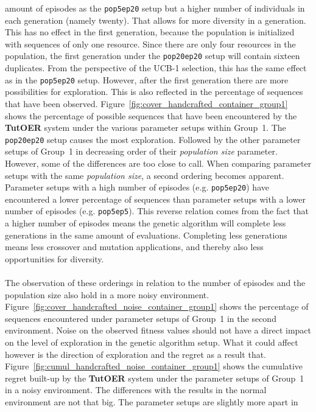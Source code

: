 amount of episodes as the \texttt{pop5ep20} setup but a higher number of
individuals in each generation (namely twenty). That allows for more diversity in a
generation. This has no effect in the first generation, because the
population is initialized with sequences of only one resource. Since there are
only four resources in the population, the first generation under the
\texttt{pop20ep20} setup will contain sixteen duplicates. From the perspective of
the UCB-1 selection, this has the same effect as in the \texttt{pop5ep20} setup.
However, after the first generation there are more possibilities for
exploration. This is also reflected in the percentage of sequences that have
been observed. Figure~\ref{fig:cover_handcrafted_container_group1}
shows the percentage of possible sequences that have been encountered by the
\textbf{TutOER} system under the various parameter setups within Group~1. The
\texttt{pop20ep20} setup causes the most exploration. Followed by the other
parameter setups of Group~1 in decreasing order of their \emph{population size}
parameter. However, some of the differences are too close to call. When comparing
parameter setups with the same \emph{population size}, a second
ordering becomes apparent. Parameter setups with a
high number of episodes (e.g. \texttt{pop5ep20}) have encountered a lower percentage of sequences than
parameter setups with a lower number of episodes (e.g. \texttt{pop5ep5}). This
reverse relation comes from the fact that a higher number of episodes means
the genetic algorithm will complete less generations in the same amount of
evaluations. Completing less generations means less crossover and mutation
applications, and thereby also less opportunities for diversity.\\\\
\noindent
The observation of these orderings in relation to the number of episodes and
the population size also hold in a more noisy environment.
Figure~\ref{fig:cover_handcrafted_noise_container_group1} shows the
percentage of sequences encountered under parameter setups of Group~1 in the
second environment. Noise on the observed fitness values should not
have a direct impact on the level of exploration in the genetic algorithm
setup. What it could affect however is the direction of exploration and the
regret as a result that.
Figure~\ref{fig:cumul_handcrafted_noise_container_group1} shows the
cumulative regret built-up by the \textbf{TutOER} system under the parameter
setups of Group~1 in a noisy environment. The differences with the results in
the normal environment are not that big. The parameter setups are slightly more apart in
